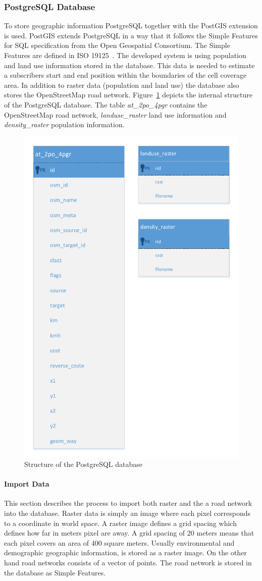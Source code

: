 \documentclass[master,english]{hgbthesis}
\begin{document}
\subsubsection{PostgreSQL Database}
To store geographic information PostgreSQL together with the PostGIS extension is used. PostGIS extends PostgreSQL in a way that it follows the Simple Features for SQL specification from the Open Geospatial Consortium. The Simple Features are defined in ISO 19125~\cite{ISO19125,ISO191252}. The developed system is using population and land use information stored in the database. This data is needed to estimate a subscribers start and end position within the boundaries of the cell coverage area. In addition to raster data (population and land use) the database also stores the OpenStreetMap road network. Figure~\ref{fig:pg_structure} depicts the internal structure of the PostgreSQL database. The table \emph{at_2po_4pgr} contains the OpenStreetMap road network, \emph{landuse_raster} land use information and \emph{density_raster} population information. 
\begin{figure}
\centering
\includegraphics[width=0.7\linewidth]{./images/pg_structure}
\caption{Structure of the PostgreSQL database}
\label{fig:pg_structure}
\end{figure}
\paragraph{Import Data}
This section describes the process to import both raster and the a road network into the database. Raster data is simply an image where each pixel corresponds to a coordinate in world space. A raster image defines a grid spacing which defines how far in meters pixel are away. A grid spacing of $20$ meters means that each pixel covers an area of $400$ square meters. Usually environmental and demographic geographic information, is stored as a raster image. On the other hand road networks consists of a vector of points. The road network is stored in the database as Simple Features.
\end{document}

